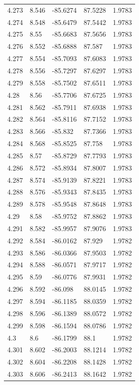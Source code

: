 \begin{tabular}{lllll}
4.273 & 8.546 & -85.6274 & 87.5228 & 1.9783 \\
4.274 & 8.548 & -85.6479 & 87.5442 & 1.9783 \\
4.275 & 8.55 & -85.6683 & 87.5656 & 1.9783 \\
4.276 & 8.552 & -85.6888 & 87.587 & 1.9783 \\
4.277 & 8.554 & -85.7093 & 87.6083 & 1.9783 \\
4.278 & 8.556 & -85.7297 & 87.6297 & 1.9783 \\
4.279 & 8.558 & -85.7502 & 87.6511 & 1.9783 \\
4.28 & 8.56 & -85.7706 & 87.6725 & 1.9783 \\
4.281 & 8.562 & -85.7911 & 87.6938 & 1.9783 \\
4.282 & 8.564 & -85.8116 & 87.7152 & 1.9783 \\
4.283 & 8.566 & -85.832 & 87.7366 & 1.9783 \\
4.284 & 8.568 & -85.8525 & 87.758 & 1.9783 \\
4.285 & 8.57 & -85.8729 & 87.7793 & 1.9783 \\
4.286 & 8.572 & -85.8934 & 87.8007 & 1.9783 \\
4.287 & 8.574 & -85.9139 & 87.8221 & 1.9783 \\
4.288 & 8.576 & -85.9343 & 87.8435 & 1.9783 \\
4.289 & 8.578 & -85.9548 & 87.8648 & 1.9783 \\
4.29 & 8.58 & -85.9752 & 87.8862 & 1.9783 \\
4.291 & 8.582 & -85.9957 & 87.9076 & 1.9783 \\
4.292 & 8.584 & -86.0162 & 87.929 & 1.9782 \\
4.293 & 8.586 & -86.0366 & 87.9503 & 1.9782 \\
4.294 & 8.588 & -86.0571 & 87.9717 & 1.9782 \\
4.295 & 8.59 & -86.0776 & 87.9931 & 1.9782 \\
4.296 & 8.592 & -86.098 & 88.0145 & 1.9782 \\
4.297 & 8.594 & -86.1185 & 88.0359 & 1.9782 \\
4.298 & 8.596 & -86.1389 & 88.0572 & 1.9782 \\
4.299 & 8.598 & -86.1594 & 88.0786 & 1.9782 \\
4.3 & 8.6 & -86.1799 & 88.1 & 1.9782 \\
4.301 & 8.602 & -86.2003 & 88.1214 & 1.9782 \\
4.302 & 8.604 & -86.2208 & 88.1428 & 1.9782 \\
4.303 & 8.606 & -86.2413 & 88.1642 & 1.9782 \\

\end{tabular}
